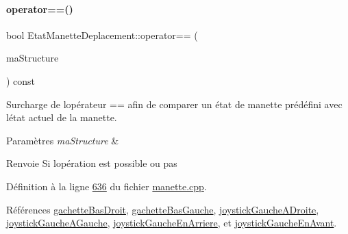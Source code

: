 \paragraph{\texorpdfstring{operator==()}{operator==()}}
{\footnotesize\ttfamily bool Etat\+Manette\+Deplacement\+::operator== (\begin{DoxyParamCaption}\item[{const \hyperlink{struct_etat_manette_deplacement}{Etat\+Manette\+Deplacement} \&}]{ma\+Structure }\end{DoxyParamCaption}) const}



Surcharge de l\textquotesingle{}opérateur == afin de comparer un état de manette prédéfini avec l\textquotesingle{}état actuel de la manette. 


\begin{DoxyParams}{Paramètres}
{\em ma\+Structure} & \\
\hline
\end{DoxyParams}
\begin{DoxyReturn}{Renvoie}
Si l\textquotesingle{}opération est possible ou pas 
\end{DoxyReturn}


Définition à la ligne \hyperlink{manette_8cpp_source_l00636}{636} du fichier \hyperlink{manette_8cpp_source}{manette.\+cpp}.



Références \hyperlink{manette_8h_source_l00185}{gachette\+Bas\+Droit}, \hyperlink{manette_8h_source_l00184}{gachette\+Bas\+Gauche}, \hyperlink{manette_8h_source_l00183}{joystick\+Gauche\+A\+Droite}, \hyperlink{manette_8h_source_l00182}{joystick\+Gauche\+A\+Gauche}, \hyperlink{manette_8h_source_l00181}{joystick\+Gauche\+En\+Arriere}, et \hyperlink{manette_8h_source_l00180}{joystick\+Gauche\+En\+Avant}.


